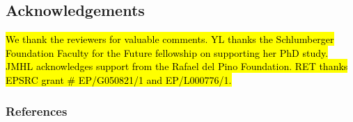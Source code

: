 \documentclass{article} %
\begin{document}




\subsection*{Acknowledgements}
\hl{We thank the reviewers for valuable comments. YL thanks the Schlumberger Foundation Faculty for the Future fellowship on supporting her PhD study. JMHL acknowledges support from the Rafael del Pino Foundation. RET thanks EPSRC grant \# EP/G050821/1 and EP/L000776/1. }

\subsubsection*{References}
\renewcommand{\section}[2]{}
\small


\end{document}
